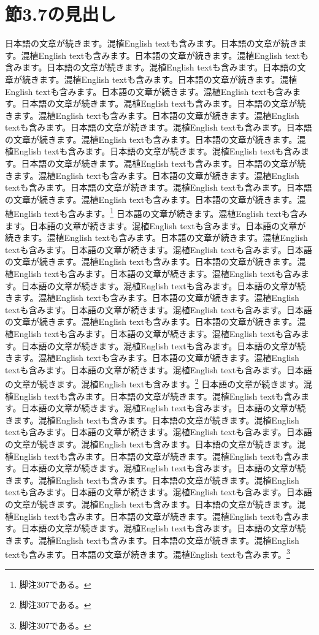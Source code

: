 \documentclass[pdflatex,book]{jlreq}
\begin{document}
\section{節3.7の見出し}
日本語の文章が続きます。混植English textも含みます。日本語の文章が続きます。混植English textも含みます。日本語の文章が続きます。混植English textも含みます。日本語の文章が続きます。混植English textも含みます。日本語の文章が続きます。混植English textも含みます。日本語の文章が続きます。混植English textも含みます。日本語の文章が続きます。混植English textも含みます。日本語の文章が続きます。混植English textも含みます。日本語の文章が続きます。混植English textも含みます。日本語の文章が続きます。混植English textも含みます。日本語の文章が続きます。混植English textも含みます。日本語の文章が続きます。混植English textも含みます。日本語の文章が続きます。混植English textも含みます。日本語の文章が続きます。混植English textも含みます。日本語の文章が続きます。混植English textも含みます。日本語の文章が続きます。混植English textも含みます。日本語の文章が続きます。混植English textも含みます。日本語の文章が続きます。混植English textも含みます。日本語の文章が続きます。混植English textも含みます。日本語の文章が続きます。混植English textも含みます。\footnote{脚注307である。}
日本語の文章が続きます。混植English textも含みます。日本語の文章が続きます。混植English textも含みます。日本語の文章が続きます。混植English textも含みます。日本語の文章が続きます。混植English textも含みます。日本語の文章が続きます。混植English textも含みます。日本語の文章が続きます。混植English textも含みます。日本語の文章が続きます。混植English textも含みます。日本語の文章が続きます。混植English textも含みます。日本語の文章が続きます。混植English textも含みます。日本語の文章が続きます。混植English textも含みます。日本語の文章が続きます。混植English textも含みます。日本語の文章が続きます。混植English textも含みます。日本語の文章が続きます。混植English textも含みます。日本語の文章が続きます。混植English textも含みます。日本語の文章が続きます。混植English textも含みます。日本語の文章が続きます。混植English textも含みます。日本語の文章が続きます。混植English textも含みます。日本語の文章が続きます。混植English textも含みます。日本語の文章が続きます。混植English textも含みます。日本語の文章が続きます。混植English textも含みます。\footnote{脚注307である。}
日本語の文章が続きます。混植English textも含みます。日本語の文章が続きます。混植English textも含みます。日本語の文章が続きます。混植English textも含みます。日本語の文章が続きます。混植English textも含みます。日本語の文章が続きます。混植English textも含みます。日本語の文章が続きます。混植English textも含みます。日本語の文章が続きます。混植English textも含みます。日本語の文章が続きます。混植English textも含みます。日本語の文章が続きます。混植English textも含みます。日本語の文章が続きます。混植English textも含みます。日本語の文章が続きます。混植English textも含みます。日本語の文章が続きます。混植English textも含みます。日本語の文章が続きます。混植English textも含みます。日本語の文章が続きます。混植English textも含みます。日本語の文章が続きます。混植English textも含みます。日本語の文章が続きます。混植English textも含みます。日本語の文章が続きます。混植English textも含みます。日本語の文章が続きます。混植English textも含みます。日本語の文章が続きます。混植English textも含みます。日本語の文章が続きます。混植English textも含みます。\footnote{脚注307である。}
\end{document}
